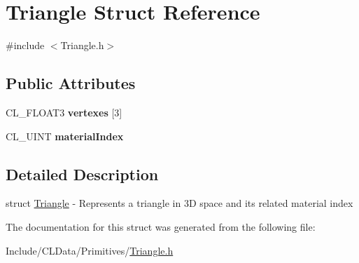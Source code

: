 \hypertarget{struct_triangle}{}\section{Triangle Struct Reference}
\label{struct_triangle}


{\ttfamily \#include $<$Triangle.\+h$>$}

\subsection*{Public Attributes}
\begin{DoxyCompactItemize}
\item 
C\+L\+\_\+\+F\+L\+O\+A\+T3 {\bfseries vertexes} \mbox{[}3\mbox{]}\hypertarget{struct_triangle_aa22bb0d7c2d7922803e146e5c618ae43}{}\label{struct_triangle_aa22bb0d7c2d7922803e146e5c618ae43}

\item 
C\+L\+\_\+\+U\+I\+NT {\bfseries material\+Index}\hypertarget{struct_triangle_a4d8ceacbb622cab55b946ffd75af2bd2}{}\label{struct_triangle_a4d8ceacbb622cab55b946ffd75af2bd2}

\end{DoxyCompactItemize}


\subsection{Detailed Description}
struct \hyperlink{struct_triangle}{Triangle} -\/ Represents a triangle in 3D space and its related material index 

The documentation for this struct was generated from the following file\+:\begin{DoxyCompactItemize}
\item 
Include/\+C\+L\+Data/\+Primitives/\hyperlink{_triangle_8h}{Triangle.\+h}\end{DoxyCompactItemize}
